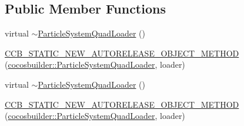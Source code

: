 \subsection*{Public Member Functions}
\begin{DoxyCompactItemize}
\item 
virtual \hyperlink{classcocosbuilder_1_1ParticleSystemQuadLoader_a55628f9438027cecd887cef4bb2079a6}{$\sim$\+Particle\+System\+Quad\+Loader} ()
\item 
\hyperlink{classcocosbuilder_1_1ParticleSystemQuadLoader_a87394650ac434ba23fd33368d752029b}{C\+C\+B\+\_\+\+S\+T\+A\+T\+I\+C\+\_\+\+N\+E\+W\+\_\+\+A\+U\+T\+O\+R\+E\+L\+E\+A\+S\+E\+\_\+\+O\+B\+J\+E\+C\+T\+\_\+\+M\+E\+T\+H\+OD} (\hyperlink{classcocosbuilder_1_1ParticleSystemQuadLoader}{cocosbuilder\+::\+Particle\+System\+Quad\+Loader}, loader)
\item 
virtual \hyperlink{classcocosbuilder_1_1ParticleSystemQuadLoader_a55628f9438027cecd887cef4bb2079a6}{$\sim$\+Particle\+System\+Quad\+Loader} ()
\item 
\hyperlink{classcocosbuilder_1_1ParticleSystemQuadLoader_a87394650ac434ba23fd33368d752029b}{C\+C\+B\+\_\+\+S\+T\+A\+T\+I\+C\+\_\+\+N\+E\+W\+\_\+\+A\+U\+T\+O\+R\+E\+L\+E\+A\+S\+E\+\_\+\+O\+B\+J\+E\+C\+T\+\_\+\+M\+E\+T\+H\+OD} (\hyperlink{classcocosbuilder_1_1ParticleSystemQuadLoader}{cocosbuilder\+::\+Particle\+System\+Quad\+Loader}, loader)
\end{DoxyCompactItemize}
